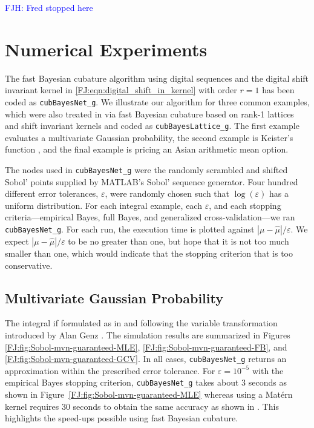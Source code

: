\documentclass[graybox,footinfo]{svmult}
\newcommand{\abs}[1]{\left\lvert #1 \right\rvert} %
\newcommand{\FJHNote}[1]{{\textcolor{blue}{FJH: #1}}}
\newcommand{\JRNote}[1]{{\textcolor{green}{JR: #1}}}
\begin{document}
\FJHNote{Fred stopped here}




%



\section{Numerical Experiments}

\label{FJ:sec:NumExp}


The fast Bayesian cubature algorithm using digital sequences and the digital shift invariant kernel in \eqref{FJ:eqn:digital_shift_in_kernel} with order $r=1$ has been coded as \texttt{cubBayesNet\_g}.  We illustrate our algorithm for three common examples, which were also treated in \cite{RatHic19a} via fast Bayesian cubature based on rank-1 lattices and shift invariant kernels and coded as \texttt{cubBayesLattice\_g}. The first example evaluates a multivariate Gaussian probability, the second example is Keister's function \cite{Kei96}, and the final example is pricing an Asian arithmetic mean option.  

The nodes used in \texttt{cubBayesNet\_g} were the randomly scrambled and shifted Sobol' points supplied by MATLAB's Sobol' sequence generator. Four hundred different error tolerances, $\varepsilon$, were randomly chosen such that $\log(\varepsilon)$ has a uniform distribution. 
For each integral example, each $\varepsilon$, and each stopping criteria---empirical Bayes, full Bayes, and generalized cross-validation---we ran \texttt{cubBayesNet\_g}.  For each run, the execution time is plotted against $\abs{\mu - \widehat{\mu}}/\varepsilon$.  We expect $\abs{\mu - \widehat{\mu}}/\varepsilon$ to be no greater than one, but hope that it is not too much smaller than one, which would indicate that the stopping criterion that is too conservative.

\subsection{Multivariate Gaussian Probability}

The integral if formulated as in \cite{RatHic19a} and following the variable transformation introduced by Alan Genz \cite{Gen92}. The simulation results are summarized in Figures \ref{FJ:fig:Sobol-mvn-guaranteed-MLE}, \ref{FJ:fig:Sobol-mvn-guaranteed-FB}, and \ref{FJ:fig:Sobol-mvn-guaranteed-GCV}.  In all cases, \texttt{cubBayesNet\_g} returns an approximation within the prescribed error tolerance. For  $\varepsilon=10^{-5}$ with the empirical Bayes stopping criterion, \texttt{cubBayesNet\_g} takes about 3 seconds as shown in Figure~\ref{FJ:fig:Sobol-mvn-guaranteed-MLE} whereas using a Mat\'ern kernel requires 30 seconds to obtain the same accuracy as shown in \cite{RatHic19a}. This highlights the speed-ups possible using fast Bayesian cubature.
\end{document}

